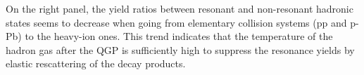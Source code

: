 On the right panel, the yield ratios between resonant and non-resonant hadronic states seems to decrease when going from elementary collision systems (pp and p-Pb) to the heavy-ion ones. This trend indicates that the temperature of the hadron gas after the QGP is sufficiently high to suppress the resonance yields by elastic rescattering of the decay products.


